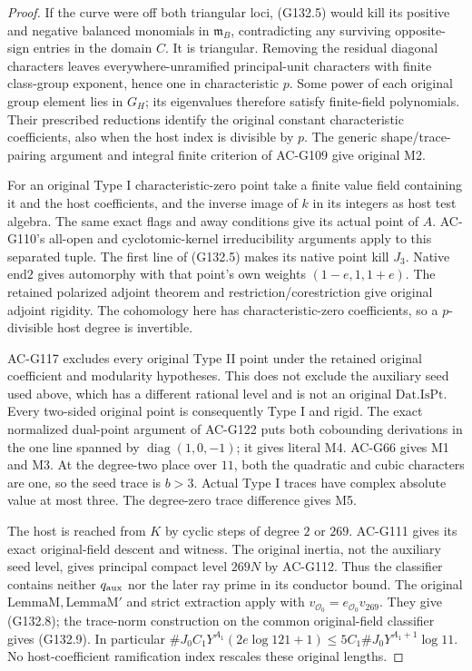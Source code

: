 \begin{proof}
If the curve were off both triangular loci, (G132.5)
would kill its positive and negative balanced monomials
in \(\mathfrak m_B\), contradicting any surviving
opposite-sign entries in the domain \(C\).
It is triangular.  Removing the residual diagonal
characters leaves everywhere-unramified principal-unit
characters with finite class-group exponent, hence one
in characteristic \(p\).
Some power of each original group element lies in
\(G_H\); its eigenvalues therefore satisfy finite-field
polynomials.  Their prescribed reductions identify
the original constant characteristic coefficients,
also when the host index is divisible by \(p\).
The generic shape/trace-pairing argument and integral
finite criterion of AC-G109 give original M2.

For an original Type I characteristic-zero point take
a finite value field containing it and the host
coefficients, and the inverse image of \(k\) in its
integers as host test algebra.
The same exact flags and away conditions give its
actual point of \(A\).
AC-G110's all-open and cyclotomic-kernel irreducibility
arguments apply to this separated tuple.
The first line of (G132.5) makes its native point kill
\(J_3\).  Native \(\mathrm{end2}\) gives automorphy
with that point's own weights \((1-e,1,1+e)\).
The retained polarized adjoint theorem and
restriction/corestriction give original adjoint
rigidity.  The cohomology here has characteristic-zero
coefficients, so a \(p\)-divisible host degree is
invertible.

AC-G117 excludes every original Type II point under
the retained original coefficient and modularity
hypotheses.  This does not exclude the auxiliary
seed used above, which has a different rational level
and is not an original \(\mathrm{Dat.IsPt}\).
Every two-sided original point is consequently Type I
and rigid.  The exact normalized dual-point argument
of AC-G122 puts both cobounding derivations in the
one line spanned by \(\operatorname{diag}(1,0,-1)\);
it gives literal M4.  AC-G66 gives M1 and M3.
At the degree-two place over \(11\), both the
quadratic and cubic characters are one, so the seed
trace is \(b>3\).  Actual Type I traces have complex
absolute value at most three.  The degree-zero trace
difference gives M5.

The host is reached from \(K\) by cyclic steps of
degree \(2\) or \(269\).  AC-G111 gives its exact
original-field descent and witness.
The original inertia, not the auxiliary seed level,
gives principal compact level \(269N\) by AC-G112.
Thus the classifier contains neither \(q_{\rm aux}\)
nor the later ray prime in its conductor bound.
The original \(\mathrm{LemmaM},\mathrm{LemmaM'}\) and
strict extraction apply with
\(v_{\mathcal O_0}=e_{\mathcal O_0}v_{269}\).
They give (G132.8); the trace-norm construction on
the common original-field classifier gives (G132.9).
In particular
\(\#J_0C_1Y^{A_1}(2e\log121+1)
 \le5C_1\#J_0Y^{A_1+1}\log11\).
No host-coefficient ramification index rescales
these original lengths.


\end{proof}
